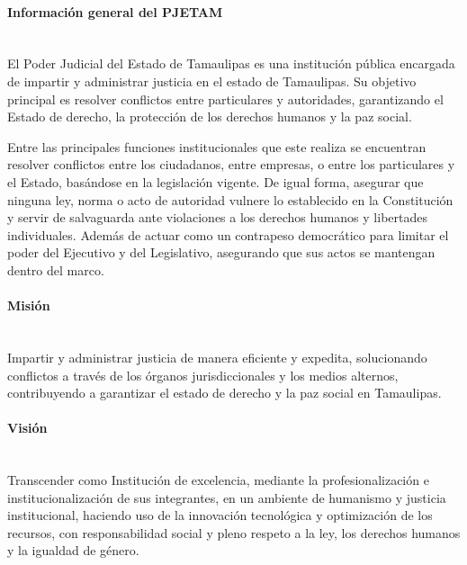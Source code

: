 \paragraph{Información general del PJETAM} ~\\
\label{sec:informacion}El Poder Judicial del Estado de Tamaulipas es una institución pública encargada de impartir y administrar justicia en el estado de Tamaulipas. Su objetivo principal es resolver conflictos entre particulares y autoridades, garantizando el Estado de derecho, la protección de los derechos humanos y la paz social.\cite{PJETAM:ReglamentoTribunalElectronico2022}

Entre las principales funciones institucionales que este realiza se encuentran resolver conflictos entre los ciudadanos, entre empresas, o entre los particulares y el Estado, basándose en la legislación vigente. De igual forma, asegurar que ninguna ley, norma o acto de autoridad vulnere lo establecido en la Constitución y servir de salvaguarda ante violaciones a los derechos humanos y libertades individuales. Además de actuar como un contrapeso democrático para limitar el poder del Ejecutivo y del Legislativo, asegurando que sus actos se mantengan dentro del marco.\cite{PJETAM:ReglamentoTribunalElectronico2022}

\paragraph{Misión} ~\\
\label{sec:mision}Impartir y administrar justicia de manera eficiente y expedita, solucionando conflictos a través de los órganos jurisdiccionales y los medios alternos, contribuyendo a garantizar el estado de derecho y la paz social en Tamaulipas.\cite{PJETAM:MisionVision}

\paragraph{Visión} ~\\
\label{sec:vision}Transcender como Institución de excelencia, mediante la profesionalización e institucionalización de sus integrantes, en un ambiente de humanismo y justicia institucional, haciendo uso de la innovación tecnológica y optimización de los recursos, con responsabilidad social y pleno respeto a la ley, los derechos humanos y la igualdad de género.\cite{PJETAM:MisionVision}

